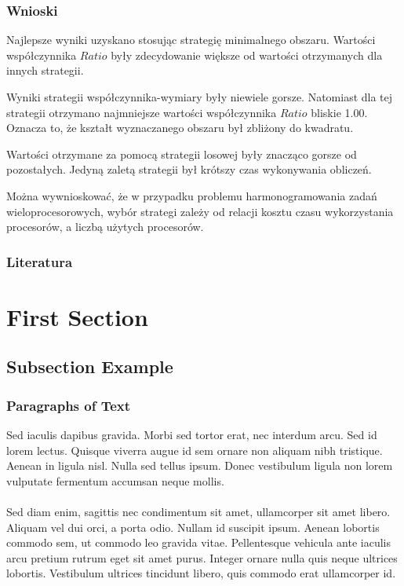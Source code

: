\documentclass{beamer}
\begin{document}
\begin{frame}
    \frametitle{Wnioski}
    \begin{outline}
        \1 Najlepsze wyniki uzyskano stosując strategię minimalnego obszaru.
        Wartości współczynnika $\textit{Ratio}$ były zdecydowanie większe od wartości otrzymanych
        dla innych strategii.
        
        \1 Wyniki strategii współczynnika-wymiary były niewiele gorsze. Natomiast dla tej
        strategii otrzymano najmniejsze wartości współczynnika $\textit{Ratio}$ bliskie 1.00.
        Oznacza to, że kształt wyznaczanego obszaru był zbliżony do kwadratu. 
        
        \1 Wartości otrzymane za pomocą strategii losowej były znacząco gorsze od pozostałych.
        Jedyną zaletą strategii był krótszy czas wykonywania obliczeń.
        
        \1 Można wywnioskować, że w przypadku problemu harmonogramowania zadań wieloprocesorowych,
        wybór strategi zależy od relacji kosztu czasu wykorzystania procesorów, a liczbą użytych
        procesorów.
    \end{outline}
\end{frame}

\begin{frame}
    \frametitle{Literatura}
    
    
\end{frame}

\section{First Section} %

\subsection{Subsection Example} %

\begin{frame}
\frametitle{Paragraphs of Text}
Sed iaculis dapibus gravida. Morbi sed tortor erat, nec interdum arcu. Sed id lorem lectus. Quisque viverra augue id sem ornare non aliquam nibh tristique. Aenean in ligula nisl. Nulla sed tellus ipsum. Donec vestibulum ligula non lorem vulputate fermentum accumsan neque mollis.\\~\\

Sed diam enim, sagittis nec condimentum sit amet, ullamcorper sit amet libero. Aliquam vel dui orci, a porta odio. Nullam id suscipit ipsum. Aenean lobortis commodo sem, ut commodo leo gravida vitae. Pellentesque vehicula ante iaculis arcu pretium rutrum eget sit amet purus. Integer ornare nulla quis neque ultrices lobortis. Vestibulum ultrices tincidunt libero, quis commodo erat ullamcorper id.
\end{frame}
\end{document}
